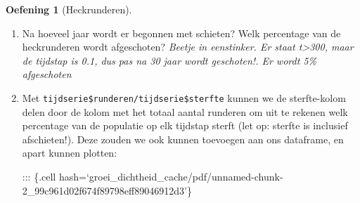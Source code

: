 \documentclass[
  a4paper,
]{scrbook}
\newenvironment{Shaded}{\begin{snugshade}}{\end{snugshade}}
\newcommand{\AttributeTok}[1]{\textcolor[rgb]{0.40,0.45,0.13}{#1}}
\newcommand{\CommentTok}[1]{\textcolor[rgb]{0.37,0.37,0.37}{#1}}
\newcommand{\DecValTok}[1]{\textcolor[rgb]{0.68,0.00,0.00}{#1}}
\newcommand{\FunctionTok}[1]{\textcolor[rgb]{0.28,0.35,0.67}{#1}}
\newcommand{\NormalTok}[1]{\textcolor[rgb]{0.00,0.23,0.31}{#1}}
\newcommand{\OtherTok}[1]{\textcolor[rgb]{0.00,0.23,0.31}{#1}}
\newcommand{\SpecialCharTok}[1]{\textcolor[rgb]{0.37,0.37,0.37}{#1}}
\newcommand{\StringTok}[1]{\textcolor[rgb]{0.13,0.47,0.30}{#1}}
\theoremstyle{definition}
\newtheorem{exercise}{Oefening}[chapter]
\theoremstyle{remark}
\begin{document}
\begin{exercise}[Heckrunderen]
\begin{enumerate}
\begin{Shaded}
\end{Shaded}
\item
  Na hoeveel jaar wordt er begonnen met schieten? Welk percentage van de
  heckrunderen wordt afgeschoten? \emph{Beetje in eenstinker. Er staat
  t\textgreater300, maar de tijdstap is 0.1, dus pas na 30 jaar wordt
  geschoten!. Er wordt 5\% afgeschoten}
\item
  Met \texttt{tijdserie\$runderen/tijdserie\$sterfte} kunnen we de
  sterfte-kolom delen door de kolom met het totaal aantal runderen om
  uit te rekenen welk percentage van de populatie op elk tijdstap sterft
  (let op: sterfte is inclusief afschieten!). Deze zouden we ook kunnen
  toevoegen aan ons dataframe, en apart kunnen plotten:

  ::: \{.cell
  hash=`groei\_dichtheid\_cache/pdf/unnamed-chunk-2\_99c961d02f674f89798eff89046912d3'\}

\begin{Shaded}
\end{Shaded}


\end{enumerate}
\end{exercise}
\end{document}
